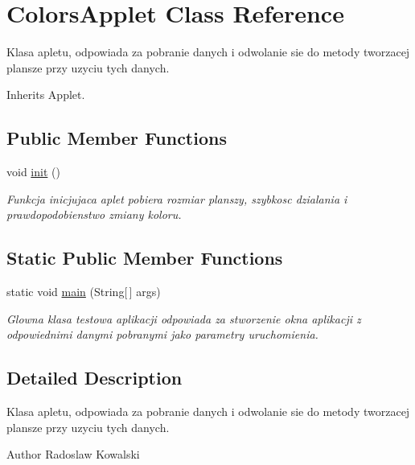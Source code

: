 \hypertarget{classColorsApplet}{\section{Colors\-Applet Class Reference}
\label{classColorsApplet}
}


Klasa apletu, odpowiada za pobranie danych i odwolanie sie do metody tworzacej plansze przy uzyciu tych danych.  




Inherits Applet.

\subsection*{Public Member Functions}
\begin{DoxyCompactItemize}
\item 
void \hyperlink{classColorsApplet_a8cd06b20df1323c3a8a5d7097a93f9f2}{init} ()
\begin{DoxyCompactList}\small\item\em Funkcja inicjujaca aplet pobiera rozmiar planszy, szybkosc dzialania i prawdopodobienstwo zmiany koloru. \end{DoxyCompactList}\end{DoxyCompactItemize}
\subsection*{Static Public Member Functions}
\begin{DoxyCompactItemize}
\item 
static void \hyperlink{classColorsApplet_a294a75ff001302ecbdfbd159d178a1ff}{main} (String\mbox{[}$\,$\mbox{]} args)
\begin{DoxyCompactList}\small\item\em Glowna klasa testowa aplikacji odpowiada za stworzenie okna aplikacji z odpowiednimi danymi pobranymi jako parametry uruchomienia. \end{DoxyCompactList}\end{DoxyCompactItemize}


\subsection{Detailed Description}
Klasa apletu, odpowiada za pobranie danych i odwolanie sie do metody tworzacej plansze przy uzyciu tych danych. 

\begin{DoxyAuthor}{Author}
Radoslaw Kowalski 
\end{DoxyAuthor}


